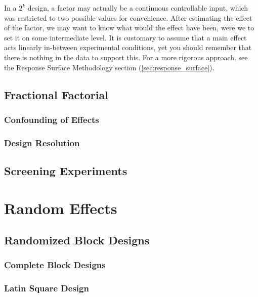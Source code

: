 \begin{remark}
In a $2^k$ design, a factor may actually be a continuous controllable input, which was restricted to two possible values for convenience. 
After estimating the effect of the factor, we may want to know what would the effect have been, were we to set it on some intermediate level.
It is customary to assume that a main effect acts linearly in-between experimental conditions, yet you should remember that there is nothing in the data to support this.
For a more rigorous approach, see the Response Surface Methodology section (\ref{sec:response_surface}).
\end{remark}




\subsection{Fractional Factorial}






\subsubsection{Confounding of Effects}

\subsubsection{Design Resolution}


\subsection{Screening Experiments}

\section{Random Effects}

\subsection{Randomized Block Designs}

\subsubsection{Complete Block Designs}


\subsubsection{Latin Square Design}


